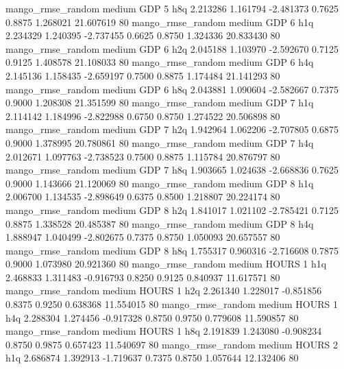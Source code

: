 mango_rmse_random     medium      GDP                 5                  h8q  2.213286 1.161794 -2.481373 0.7625 0.8875  1.268021   21.607619 80
mango_rmse_random     medium      GDP                 6                  h1q  2.234329 1.240395 -2.737455 0.6625 0.8750  1.324336   20.833430 80
mango_rmse_random     medium      GDP                 6                  h2q  2.045188 1.103970 -2.592670 0.7125 0.9125  1.408578   21.108033 80
mango_rmse_random     medium      GDP                 6                  h4q  2.145136 1.158435 -2.659197 0.7500 0.8875  1.174484   21.141293 80
mango_rmse_random     medium      GDP                 6                  h8q  2.043881 1.090604 -2.582667 0.7375 0.9000  1.208308   21.351599 80
mango_rmse_random     medium      GDP                 7                  h1q  2.114142 1.184996 -2.822988 0.6750 0.8750  1.274522   20.506898 80
mango_rmse_random     medium      GDP                 7                  h2q  1.942964 1.062206 -2.707805 0.6875 0.9000  1.378995   20.780861 80
mango_rmse_random     medium      GDP                 7                  h4q  2.012671 1.097763 -2.738523 0.7500 0.8875  1.115784   20.876797 80
mango_rmse_random     medium      GDP                 7                  h8q  1.903665 1.024638 -2.668836 0.7625 0.9000  1.143666   21.120069 80
mango_rmse_random     medium      GDP                 8                  h1q  2.006700 1.134535 -2.898649 0.6375 0.8500  1.218807   20.224174 80
mango_rmse_random     medium      GDP                 8                  h2q  1.841017 1.021102 -2.785421 0.7125 0.8875  1.338528   20.485387 80
mango_rmse_random     medium      GDP                 8                  h4q  1.888947 1.040499 -2.802675 0.7375 0.8750  1.050093   20.657557 80
mango_rmse_random     medium      GDP                 8                  h8q  1.755317 0.960316 -2.716608 0.7875 0.9000  1.073980   20.921360 80
mango_rmse_random     medium    HOURS                 1                  h1q  2.468833 1.311483 -0.916793 0.8250 0.9125  0.840937   11.617571 80
mango_rmse_random     medium    HOURS                 1                  h2q  2.261340 1.228017 -0.851856 0.8375 0.9250  0.638368   11.554015 80
mango_rmse_random     medium    HOURS                 1                  h4q  2.288304 1.274456 -0.917328 0.8750 0.9750  0.779608   11.590857 80
mango_rmse_random     medium    HOURS                 1                  h8q  2.191839 1.243080 -0.908234 0.8750 0.9875  0.657423   11.540697 80
mango_rmse_random     medium    HOURS                 2                  h1q  2.686874 1.392913 -1.719637 0.7375 0.8750  1.057644   12.132406 80
